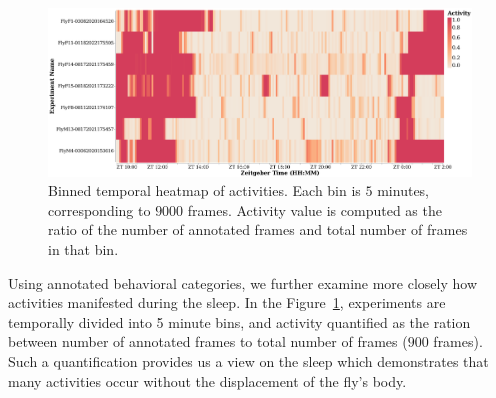 \begin{figure}[b!]
	\centering\includegraphics[width=0.95\linewidth]{figures/ActivityBinned-Ann-WT-5T.pdf}
	\caption[Binned temporal heatmap of activities.]{Binned temporal heatmap of activities.
		Each bin is $5$ minutes, corresponding to $9000$ frames.
		Activity value is computed as the ratio of the number of annotated frames and total number of frames in that bin. \label{figure:heatmap-microactivity}}
\end{figure}

Using annotated behavioral categories, we further examine more closely how activities manifested during the sleep.
In the Figure~\ref{figure:heatmap-microactivity}, experiments are temporally divided into 5 minute bins, and activity quantified as the ration between number of annotated frames to total number of frames ($900$ frames). Such a quantification provides us a view on the sleep which demonstrates that many activities occur without the displacement of the fly's body.

